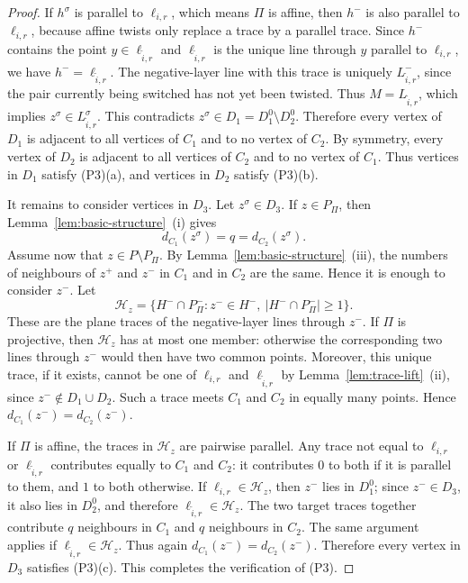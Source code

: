 \documentclass[reqno,a4paper,11pt]{article}
\theoremstyle{definition}
\theoremstyle{remark}
\begin{document}
\begin{proof}
If $h^\sigma$ is parallel to $\ell_{i,r}$, which means $\Pi$ is affine, then $h^-$ is also parallel to $\ell_{i,r}$, because affine twists only replace a trace by a parallel trace.
Since $h^-$ contains the point $y\in\ell_{\widetilde i,r}$ and $\ell_{\widetilde i,r}$ is the unique line through $y$ parallel to $\ell_{i,r}$, we have $h^-=\ell_{\widetilde i,r}$.
The negative-layer line with this trace is uniquely $L_{\widetilde i,r}^-$, since the pair currently being switched has not yet been twisted.
Thus $M=L_{\widetilde i,r}$, which implies $z^\sigma\in L_{\widetilde i,r}^\sigma$.
This contradicts $z^\sigma\in D_1=D_1^0\setminus D_2^0$.
Therefore every vertex of $D_1$ is adjacent to all vertices of $C_1$ and to no vertex of $C_2$.
By symmetry, every vertex of $D_2$ is adjacent to all vertices of $C_2$ and to no vertex of $C_1$.
Thus vertices in $D_1$ satisfy  (P3)(a), and vertices in $D_2$ satisfy  (P3)(b).

It remains to consider vertices in $D_3$.
Let $z^\sigma\in D_3$.
If $z\in P_\Pi$, then Lemma~\ref{lem:basic-structure}~(i) gives
\[
d_{C_1}(z^\sigma)=q=d_{C_2}(z^\sigma).
\]
Assume now that $z\in P\setminus P_\Pi$.
By Lemma~\ref{lem:basic-structure}~(iii), the numbers of neighbours of $z^+$ and $z^-$ in $C_1$ and in $C_2$ are the same.
Hence it is enough to consider $z^-$.
Let
\[
\mathcal H_z=
\{H^-\cap P_\Pi^-:z^-\in H^-,\ |H^-\cap P_\Pi^-|\ge 1\}.
\]
These are the plane traces of the negative-layer lines through $z^-$.
If $\Pi$ is projective, then $\mathcal H_z$ has at most one member: otherwise the corresponding two lines through $z^-$ would then have two common points.  
Moreover, this unique trace, if it exists, cannot be one of $\ell_{i,r}$ and $\ell_{\widetilde i,r}$ by Lemma~\ref{lem:trace-lift}~(ii), since $z^-\notin D_1\cup D_2$. 
 Such a trace meets $C_1$ and $C_2$ in equally many points.
   Hence $d_{C_1}(z^-)=d_{C_2}(z^-)$.

If $\Pi$ is affine, the traces in $\mathcal H_z$ are pairwise parallel.
Any trace not equal to $\ell_{i,r}$ or $\ell_{\widetilde i,r}$ contributes equally to $C_1$ and $C_2$: it contributes $0$ to both if it is parallel to them, and $1$ to both otherwise.
If $\ell_{i,r}\in\mathcal H_z$, then $z^-$ lies in $D_1^0$; since $z^-\in D_3$, it also lies in $D_2^0$, and therefore $\ell_{\widetilde i,r}\in\mathcal H_z$.
The two target traces together contribute $q$ neighbours in $C_1$ and $q$ neighbours in $C_2$.
The same argument applies if $\ell_{\widetilde i,r}\in\mathcal H_z$.
Thus again $d_{C_1}(z^-)=d_{C_2}(z^-)$.
Therefore every vertex in $D_3$ satisfies  (P3)(c).
This completes the verification of  (P3).


\end{proof}
\end{document}
